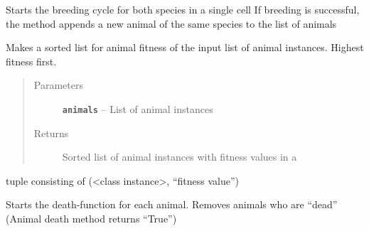 \documentclass[a4paper,10pt,openany,oneside]{sphinxmanual}
\begin{document}
\begin{fulllineitems}
\begin{fulllineitems}
\begin{quote}
\begin{description}
\end{description}\end{quote}

\end{fulllineitems}


\begin{fulllineitems}
\label{landscape:biosim.landscape.Landscape.breeding_cycle}
Starts the breeding cycle for both species in a single cell
If breeding is successful, the method appends a new animal
of the same species to the list of animals

\end{fulllineitems}


\begin{fulllineitems}
\label{landscape:biosim.landscape.Landscape.calc_fitness}
Makes a sorted list for animal fitness of the input list of animal
instances. Highest fitness first.
\begin{quote}\begin{description}
\item[{Parameters}] \leavevmode
\textbf{\texttt{animals}} -- List of animal instances

\item[{Returns}] \leavevmode
Sorted list of animal instances with fitness values in a

\end{description}\end{quote}

tuple consisting of (\textless{}class instance\textgreater{}, ``fitness value'')

\end{fulllineitems}


\begin{fulllineitems}
\label{landscape:biosim.landscape.Landscape.death_cycle}
Starts the death-function for each animal.
Removes animals who are ``dead'' (Animal death method returns ``True'')

\end{fulllineitems}


\end{fulllineitems}
\end{document}
